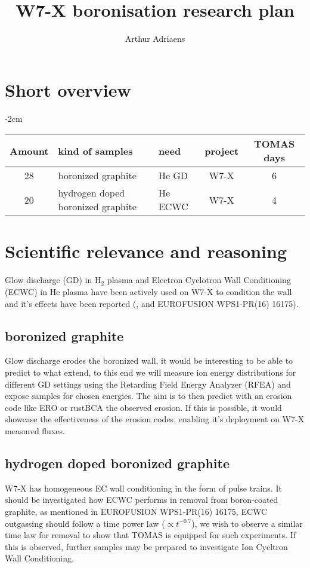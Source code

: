 \documentclass{article}
\title{W7-X boronisation research plan}
\author{Arthur Adriaens}
\begin{document}
\maketitle

\section{Short overview}
\begin{center}
    \addtolength{\leftskip} {-2cm} %
    \addtolength{\rightskip}{-2cm}
    \begin{tabular}{||c p{4cm} p{4cm} c c||}
         \hline
         Amount & kind of samples & need & project & TOMAS days \\ [0.5ex]
         \hline\hline
         28 & boronized graphite & He GD & W7-X & 6 \\
         20 & hydrogen doped boronized graphite & He ECWC & W7-X & 4 \\
         \hline
    \end{tabular}
\end{center}
\section{Scientific relevance and reasoning}
Glow discharge (GD) in H$_2$ plasma and Electron Cyclotron Wall Conditioning
(ECWC) in He plasma have been actively used on W7-X to condition the wall and
it's effects have been reported (\cite{Goriaev_2020},\cite{WAUTERS2018235} and
EUROFUSION WPS1-PR(16) 16175).

\subsection*{boronized graphite}
Glow discharge erodes the boronized wall, it would be interesting to be 
able to predict to what extend, to this end we will measure ion energy distributions
for different GD settings using the Retarding Field Energy Analyzer (RFEA) and expose 
samples for chosen energies. The aim is to then predict with an erosion code like ERO or 
rustBCA the observed erosion. If this is possible, it would showcase the effectiveness
of the erosion codes, enabling it's deployment on W7-X measured fluxes.

\subsection*{hydrogen doped boronized graphite}
W7-X has homogeneous EC wall conditioning in the form of pulse trains.
It should be investigated how ECWC performs%
in removal from boron-coated graphite, as mentioned in EUROFUSION WPS1-PR(16) 16175, 
ECWC outgassing should follow a time power law ($\propto t^{-0.7}$), 
we wish to observe a similar time law for removal 
to show that TOMAS is equipped for such experiments.
If this is observed, further samples may be prepared to investigate Ion Cycltron Wall
Conditioning.
\end{document}
